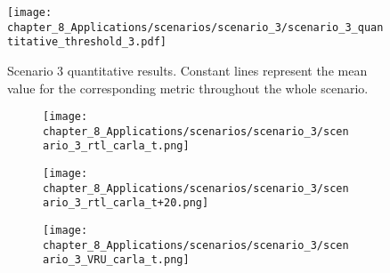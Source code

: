 \begin{figure}[]
	\centering
	\texttt{[image: chapter\_8\_Applications/scenarios/scenario\_3/scenario\_3\_quantitative\_threshold\_3.pdf]}
	\caption[Scenario 3 quantitative results]{Scenario 3 quantitative results. Constant lines represent the mean value for the corresponding metric throughout the whole scenario.}
	\label{fig:chapter_8_Applications/scenarios/scenario_3/scenario_3_quantitative_threshold_3}
\end{figure}

\begin{figure}[]
	\begin{subfigure}{0.42\textwidth}
		\texttt{[image: chapter\_8\_Applications/scenarios/scenario\_3/scenario\_3\_rtl\_carla\_t.png]}
		\caption{}
		\label{subfig:chapter_8_Applications/scenarios/scenario_3/scenario_3_rtl_carla_t}
	\end{subfigure}
	\hfill
	\begin{subfigure}{0.42\textwidth}
		\caption{}
		\label{subfig:chapter_8_Applications/scenarios/scenario_3/scenario_3_rtl_rviz_t}
	\end{subfigure}
	\begin{subfigure}{0.42\textwidth}
		\texttt{[image: chapter\_8\_Applications/scenarios/scenario\_3/scenario\_3\_rtl\_carla\_t+20.png]}
		\caption{}
		\label{subfig:chapter_8_Applications/scenarios/scenario_3/scenario_3_rtl_carla_t+20}
	\end{subfigure}
	\hfill
	\begin{subfigure}{0.42\textwidth}
		\caption{}
		\label{subfig:chapter_8_Applications/scenarios/scenario_3/scenario_3_rtl_rviz_t+20}
	\end{subfigure}
	\begin{subfigure}{0.42\textwidth}
		\texttt{[image: chapter\_8\_Applications/scenarios/scenario\_3/scenario\_3\_VRU\_carla\_t.png]}
		\caption{}
		\label{subfig:chapter_8_Applications/scenarios/scenario_3/scenario_3_VRU_carla_t}
	\end{subfigure}
	\hfill
	\begin{subfigure}{0.42\textwidth}

\end{subfigure}
\end{figure}
